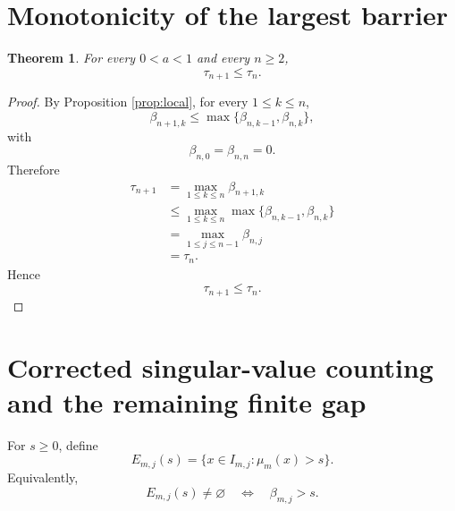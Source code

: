 \documentclass[11pt]{amsart}
\numberwithin{equation}{section}
\newtheorem{theorem}{Theorem}[section]
\begin{document}
\section{Monotonicity of the largest barrier}

\begin{theorem}\label{thm:main}
For every \(0<a<1\) and every \(n\ge2\),
\[
        \tau_{n+1}\le\tau_n.
\]
\end{theorem}

\begin{proof}
By Proposition \ref{prop:local}, for every \(1\le k\le n\),
\[
        \beta_{n+1,k}
        \le
        \max\{\beta_{n,k-1},\beta_{n,k}\},
\]
with
\[
        \beta_{n,0}=\beta_{n,n}=0.
\]
Therefore
\[
\begin{aligned}
        \tau_{n+1}
        &=
        \max_{1\le k\le n}\beta_{n+1,k}                                      \\
        &\le
        \max_{1\le k\le n}
        \max\{\beta_{n,k-1},\beta_{n,k}\}                                    \\
        &=
        \max_{1\le j\le n-1}\beta_{n,j}                                      \\
        &=
        \tau_n.
\end{aligned}
\]
Hence
\[
        \tau_{n+1}\le\tau_n.
\]
\end{proof}

\section{Corrected singular-value counting and the remaining finite gap}

For \(s\ge 0\), define
\[
        E_{m,j}(s)
        =
        \{x\in I_{m,j}:\mu_m(x)>s\}.
\]
Equivalently,
\[
        E_{m,j}(s)\ne\varnothing
        \quad\Longleftrightarrow\quad
        \beta_{m,j}>s.
\]
\end{document}
